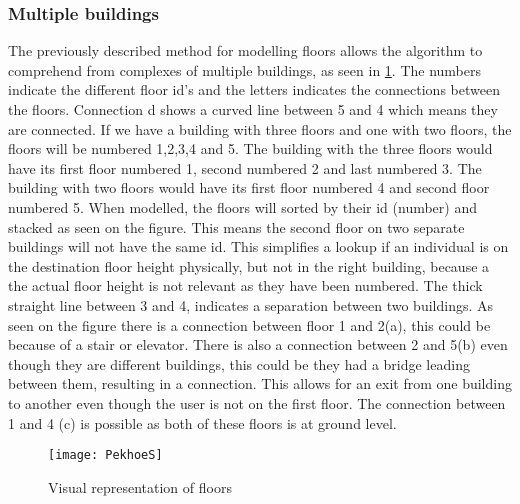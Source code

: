 \subsubsection{Multiple buildings}

The previously described method for modelling floors allows the algorithm to comprehend from complexes of multiple buildings, as seen in \cref{fig:PekhoeS}. The numbers indicate the different floor id's and the letters indicates the connections between the floors. Connection d shows a curved line between 5 and 4 which means they are connected. If we have a building with three floors and one with two floors, the floors will be numbered 1,2,3,4 and 5. The building with the three floors would have its first floor numbered 1, second numbered 2 and last numbered 3. The building with two floors would have its first floor numbered 4 and second floor numbered 5. When modelled, the floors will sorted by their id (number) and stacked as seen on the figure. This means the second floor on two separate buildings will not have the same id. This simplifies a lookup if an individual is on the destination floor height physically, but not in the right building, because a the actual floor height is not relevant as they have been numbered. The thick straight line between 3 and 4, indicates a separation between two buildings. As seen on the figure there is a connection between floor 1 and 2(a), this could be because of a stair or elevator. There is also a connection between 2 and 5(b) even though they are different buildings, this could be they had a bridge leading between them, resulting in a connection. This allows for an exit from one building to another even though the user is not on the first floor. The connection between 1 and 4 (c) is possible as both of these floors is at ground level.
\label{e_vertex}
\begin{figure}[ht!]
    \centering
    \texttt{[image: PekhoeS]}
    \caption{Visual representation of floors}
    \label{fig:PekhoeS}
  \end{figure}
